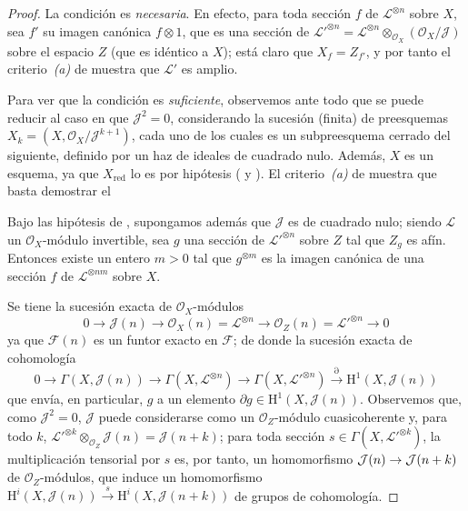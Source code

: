 \documentclass[oneside,10pt]{amsart}
\makeatletter
\newcommand{\ega@arrow}[2]{\mathchoice{#1}{#2}{#2}{#2}}
\renewcommand{\to}{\ega@arrow{\longrightarrow}{\rightarrow}}
\newcommand{\oldpage}[2][]{\marginnote{\normalfont\footnotesize\textbf{#1}~|~#2}\ignorespaces}
\let\EGAOriginalLabel\label
\renewcommand{\label}[1]{\phantomsection\EGAOriginalLabel{#1}}
\makeatother
\begin{document}
\begin{proof}
La condición es \emph{necesaria}.
En efecto, para toda sección $f$ de $\mathcal{L}^{\otimes n}$ sobre $X$, sea $f'$ su imagen canónica $f\otimes1$, que es una sección de $\mathcal{L}'^{\otimes n}=\mathcal{L}^{\otimes n}
\otimes_{\mathcal{O}_X}(\mathcal{O}_X/\mathcal{J})$ sobre el espacio $Z$ (que es idéntico a $X$);
está claro que $X_f=Z_{f'}$, y por tanto el criterio~\emph{(a)} de  muestra que $\mathcal{L}'$ es amplio.

Para ver que la condición es \emph{suficiente}, observemos ante todo que se puede reducir al caso en que $\mathcal{J}^2=0$, considerando la sucesión (finita) de preesquemas $X_k=(X,\mathcal{O}_X/\mathcal{J}^{k+1})$, cada uno de los cuales es un subpreesquema cerrado del siguiente, definido por un haz de ideales de cuadrado nulo.
Además, $X$ es un esquema, ya que $X_{\mathrm{red}}$ lo es por hipótesis ( y ).
El criterio~\emph{(a)} de  muestra que basta demostrar el
  \begin{lemma}[4.5.13.1]
  \label{II.4.5.13.1-fr}
  Bajo las hipótesis de , supongamos además que $\mathcal{J}$ es de cuadrado nulo;
  siendo $\mathcal{L}$ un $\mathcal{O}_X$-módulo invertible, sea $g$ una sección de $\mathcal{L}'^{\otimes n}$ sobre $Z$ tal que $Z_g$ es afín.
  Entonces existe un entero $m>0$ tal que $g^{\otimes m}$ es la imagen canónica de una sección $f$ de $\mathcal{L}^{\otimes nm}$ sobre $X$.
  \end{lemma}

  Se tiene la sucesión exacta de $\mathcal{O}_X$-módulos
  \[
  0\longrightarrow\mathcal{J}(n)\longrightarrow
  \mathcal{O}_X(n)=\mathcal{L}^{\otimes n}\longrightarrow
  \mathcal{O}_Z(n)=\mathcal{L}'^{\otimes n}\longrightarrow0
\]
\oldpage[II]{88}
  ya que $\mathcal{F}(n)$ es un funtor exacto en $\mathcal{F}$;
  de donde la sucesión exacta de cohomología
  \[
  0\longrightarrow\Gamma(X,\mathcal{J}(n))\longrightarrow
  \Gamma(X,\mathcal{L}^{\otimes n})\longrightarrow
  \Gamma(X,\mathcal{L}'^{\otimes n})\xrightarrow{\partial}
  \mathrm{H}^1(X,\mathcal{J}(n))
\]
  que envía, en particular, $g$ a un elemento $\partial g\in\mathrm{H}^1(X,\mathcal{J}(n))$.
  Observemos que, como $\mathcal{J}^2=0$, $\mathcal{J}$ puede considerarse como un $\mathcal{O}_Z$-módulo cuasicoherente y, para todo $k$, $\mathcal{L}'^{\otimes k}\otimes_{\mathcal{O}_Z}\mathcal{J}(n)
=\mathcal{J}(n+k)$;
  para toda sección $s\in\Gamma(X,\mathcal{L}'^{\otimes k})$, la multiplicación tensorial por $s$ es, por tanto, un homomorfismo $\mathcal{J}(n)\to\mathcal{J}(n+k)$ de $\mathcal{O}_Z$-módulos, que induce un homomorfismo $\mathrm{H}^i(X,\mathcal{J}(n))\xrightarrow{s}
\mathrm{H}^i(X,\mathcal{J}(n+k))$ de grupos de cohomología.


\end{proof}
\end{document}
